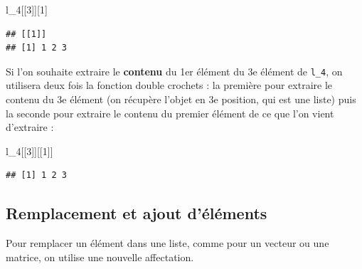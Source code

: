 \documentclass[
  11pt,
]{book}
\newenvironment{Shaded}{\begin{snugshade}}{\end{snugshade}}
\newcommand{\DecValTok}[1]{\textcolor[rgb]{0.00,0.00,0.81}{#1}}
\newcommand{\FunctionTok}[1]{\textcolor[rgb]{0.00,0.00,0.00}{#1}}
\newcommand{\NormalTok}[1]{#1}
\newcommand{\OtherTok}[1]{\textcolor[rgb]{0.56,0.35,0.01}{#1}}
\newcommand{\SpecialCharTok}[1]{\textcolor[rgb]{0.00,0.00,0.00}{#1}}
\newcommand{\StringTok}[1]{\textcolor[rgb]{0.31,0.60,0.02}{#1}}
\numberwithin{equation}{section}
\numberwithin{countremarque}{section}
\begin{document}
\begin{Shaded}
\begin{Highlighting}[]
\NormalTok{l\_4[[}\DecValTok{3}\NormalTok{]][}\DecValTok{1}\NormalTok{]}
\end{Highlighting}
\end{Shaded}

\begin{lstlisting}
## [[1]]
## [1] 1 2 3
\end{lstlisting}

Si l'on souhaite extraire le \textbf{contenu} du 1er élément du 3e élément de \texttt{l\_4}, on utilisera deux fois la fonction double crochets : la première pour extraire le contenu du 3e élément (on récupère l'objet en 3e position, qui est une liste) puis la seconde pour extraire le contenu du premier élément de ce que l'on vient d'extraire :

\begin{Shaded}
\begin{Highlighting}[]
\NormalTok{l\_4[[}\DecValTok{3}\NormalTok{]][[}\DecValTok{1}\NormalTok{]]}
\end{Highlighting}
\end{Shaded}

\begin{lstlisting}
## [1] 1 2 3
\end{lstlisting}

\hypertarget{remplacement-et-ajout-duxe9luxe9ments}{%
\subsection{Remplacement et ajout d'éléments}\label{remplacement-et-ajout-duxe9luxe9ments}}

Pour remplacer un élément dans une liste, comme pour un vecteur ou une matrice, on utilise une nouvelle affectation.

\begin{Shaded}
\end{Shaded}
\end{document}
